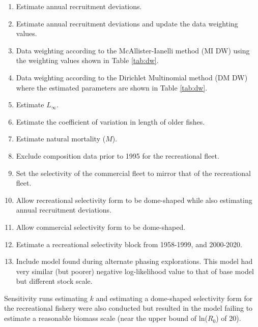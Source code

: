 \documentclass[11pt,
  english,
  a4paper,
]{article}
\begin{document}
\begin{enumerate}
   
  \item Estimate annual recruitment deviations.
  
  \item Estimate annual recruitment deviations and update the data weighting values.

  \item Data weighting according to the McAllister-Ianelli method (MI DW) using the weighting values shown in Table \ref{tab:dw}. 
  
  \item Data weighting according to the Dirichlet Multinomial method (DM DW) where the estimated parameters are shown in Table \ref{tab:dw}. 

  \item Estimate $L_{\infty}$.

  \item Estimate the coefficient of variation in length of older fishes.

  \item Estimate natural mortality ($M$).
  
  \item Exclude composition data prior to 1995 for the recreational fleet.
  
  \item Set the selectivity of the commercial fleet to mirror that of the recreational fleet.
  
  \item Allow recreational selectivity form to be dome-shaped while also estimating annual recruitment deviations. 
  
  \item Allow commercial selectivity form to be dome-shaped.

  \item Estimate a recreational selectivity block from 1958-1999, and 2000-2020.   
  
  \item Include model found during alternate phasing explorations. This model had very similar (but poorer) negative log-likelihood value to that of base model but different stock scale.
  
\end{enumerate}


Sensitivity runs estimating {\(k\)\leavevmode\tagmcend\tagstructend} and estimating a dome-shaped selectivity form for the recreational fishery were also conducted but resulted in the model failing to estimate a reasonable biomass scale (near the upper bound of ln({\(R_0\)\leavevmode\tagmcend\tagstructend}) of 20).
\end{document}
